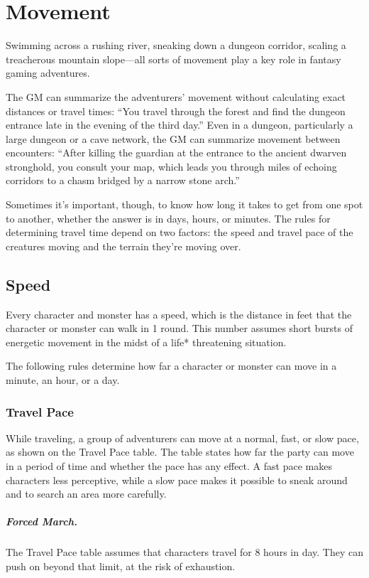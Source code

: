 \section{Movement}

Swimming across a rushing river, sneaking down a dungeon corridor, scaling a treacherous mountain slope—all sorts of movement play a key role in fantasy gaming adventures.

The GM can summarize the adventurers' movement without calculating exact distances or travel times: “You travel through the forest and find the dungeon entrance late in the evening of the third day.” Even in a dungeon, particularly a large dungeon or a cave network, the GM can summarize movement between encounters: “After killing the guardian at the entrance to the ancient dwarven stronghold, you consult your map, which leads you through miles of echoing corridors to a chasm bridged by a narrow stone arch.”

Sometimes it's important, though, to know how long it takes to get from one spot to another, whether the answer is in days, hours, or minutes. The rules for determining travel time depend on two factors: the speed and travel pace of the creatures moving and the terrain they're moving over.

\subsection{Speed}

Every character and monster has a speed, which is the distance in feet that the character or monster can walk in 1 round. This number assumes short bursts of energetic movement in the midst of a life* threatening situation.

The following rules determine how far a character or monster can move in a minute, an hour, or a day.

\subsubsection{Travel Pace}

While traveling, a group of adventurers can move at a normal, fast, or slow pace, as shown on the Travel Pace table. The table states how far the party can move in a period of time and whether the pace has any effect. A fast pace makes characters less perceptive, while a slow pace makes it possible to sneak around and to search an area more carefully.

\subparagraph*{Forced March.} The Travel Pace table assumes that characters travel for 8 hours in day. They can push on beyond that limit, at the risk of exhaustion.

